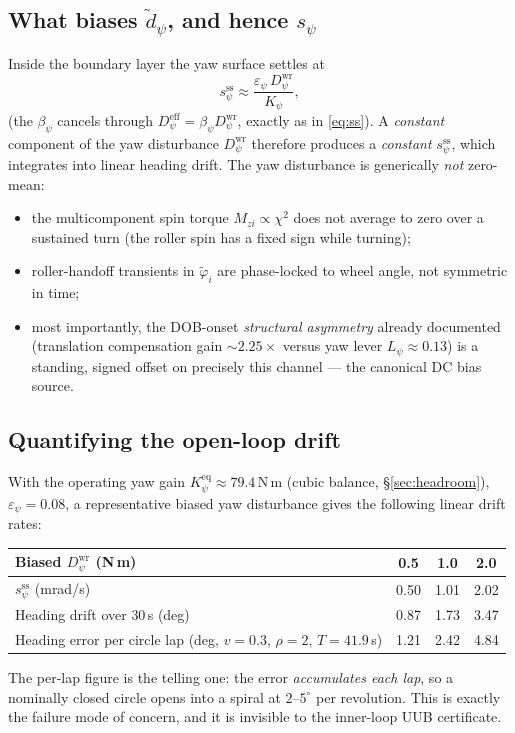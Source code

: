 \documentclass[11pt]{article}
\theoremstyle{plain}
\theoremstyle{definition}
\newcommand{\Deff}{D^{\mathrm{eff}}}
\newcommand{\Dwr}{D^{\mathrm{wr}}}
\begin{document}
\subsection{What biases $\tilde d_\psi$, and hence $s_\psi$}
Inside the boundary layer the yaw surface settles at
\begin{equation}
s_\psi^{\mathrm{ss}}\approx\frac{\varepsilon_\psi\,\Dwr_\psi}{K_\psi},
\label{eq:spsi_ss}
\end{equation}
(the $\beta_\psi$ cancels through $\Deff_\psi=\beta_\psi\Dwr_\psi$, exactly as in
\eqref{eq:ss}). A \emph{constant} component of the yaw disturbance $\Dwr_\psi$
therefore produces a \emph{constant} $s_\psi^{\mathrm{ss}}$, which integrates into
linear heading drift. The yaw disturbance is generically \emph{not} zero-mean:
\begin{itemize}[leftmargin=1.5em]
\item the multicomponent spin torque $M_{zi}\propto\chi^2$ does not average to zero
over a sustained turn (the roller spin has a fixed sign while turning);
\item roller-handoff transients in $\tilde\varphi_i$ are phase-locked to wheel angle,
not symmetric in time;
\item most importantly, the DOB-onset \emph{structural asymmetry} already documented
(translation compensation gain ${\sim}2.25\times$ versus yaw lever
$L_\psi\approx0.13$) is a standing, signed offset on precisely this channel --- the
canonical DC bias source.
\end{itemize}

\subsection{Quantifying the open-loop drift}
With the operating yaw gain $K_\psi^{\mathrm{eq}}\approx79.4\,$N\,m (cubic balance,
\S\ref{sec:headroom}), $\varepsilon_\psi=0.08$, a representative biased yaw
disturbance gives the following linear drift rates:
\begin{center}
\begin{tabular}{lccc}
\toprule
Biased $\Dwr_\psi$ (N\,m) & 0.5 & 1.0 & 2.0\\
\midrule
$s_\psi^{\mathrm{ss}}$ (mrad/s) & 0.50 & 1.01 & 2.02\\
Heading drift over $30\,$s (deg) & 0.87 & 1.73 & 3.47\\
Heading error per circle lap (deg, $v{=}0.3$, $\rho{=}2$, $T{=}41.9\,$s) & 1.21 & 2.42 & 4.84\\
\bottomrule
\end{tabular}
\end{center}
The per-lap figure is the telling one: the error \emph{accumulates each lap}, so a
nominally closed circle opens into a spiral at $2$--$5^\circ$ per revolution. This is
exactly the failure mode of concern, and it is invisible to the inner-loop UUB
certificate.
\end{document}
